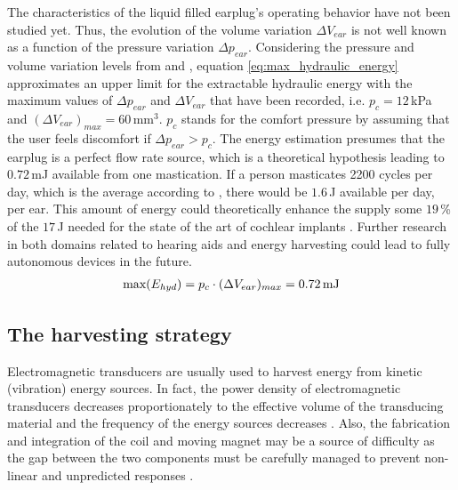 \documentclass[3p,twocolumn,preprint]{elsarticle}
\begin{document}
The characteristics of the liquid filled earplug's operating behavior have not been studied yet. Thus, the evolution of the volume variation $\Delta V_{ear}$ is not well known as a function of the pressure variation $\Delta p_{ear}$. Considering the pressure and volume variation levels from \cite{Delnavaz2012} and \cite{Bouchard-Roy2020}, equation \ref{eq:max_hydraulic_energy} approximates an upper limit for the extractable hydraulic energy with the maximum values of $\Delta p_{ear}$ and $\Delta V_{ear}$ that have been recorded, i.e. $p_c=12$\,kPa and $(\Delta V_{ear})_{max}=60$\,mm$^3$. $p_c$ stands for the comfort pressure by assuming that the user feels discomfort if $\Delta p_{ear}>p_c$. The energy estimation presumes that the earplug is a perfect flow rate source, which is a theoretical hypothesis leading to $0.72$\,mJ available from one mastication. If a person masticates 2200 cycles per day, which is the average according to \cite{Goll2011}, there would be $1.6$\,J available per day, per ear. This amount of energy could theoretically enhance the supply some $19$\,\% of the $17$\,J needed for the state of the art of cochlear implants \cite{Kulah2022}. Further research in both domains related to hearing aids and energy harvesting could lead to fully autonomous devices in the future.
\begin{align}
	\text{max}(E_{hyd}) = p_c \cdot (\Delta V_{ear})_{max} = 0.72\text{\,mJ}
	\label{eq:max_hydraulic_energy}
\end{align}

	\subsection{The harvesting strategy}	
	\label{The harvesting strategy}
Electromagnetic transducers are usually used to harvest energy from kinetic (vibration) energy sources. In fact, the power density of electromagnetic transducers decreases proportionately to the effective volume of the transducing material and the frequency of the energy sources decreases \cite{Priya2017,Kulah2008}. Also, the fabrication and integration of the coil and moving magnet may be a source of difficulty as the gap between the two components must be carefully managed to prevent non-linear and unpredicted responses \cite{Caruntu2001}. 
\end{document}

